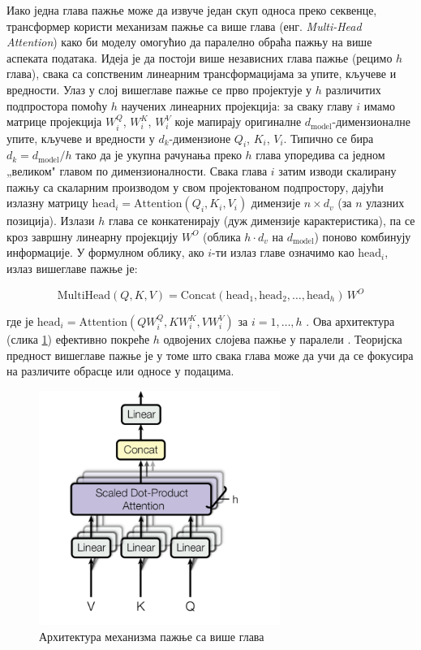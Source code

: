 \documentclass[a4paper, 12pt, master, utf8]{etf}
\begin{document}
Иако једна глава пажње може да извуче један скуп односа преко секвенце, трансформер користи механизам пажње са више глава (енг. \textit{Multi-Head Attention}) како би моделу омогућио да паралелно обраћа пажњу на више аспеката података. Идеја је да постоји више независних глава пажње (рецимо $h$ глава), свака са сопственим линеарним трансформацијама за упите, кључеве и вредности. Улаз у слој вишеглаве пажње се прво пројектује у $h$ различитих подпростора помоћу $h$ научених линеарних пројекција: за сваку главу $i$ имамо матрице пројекција $W_i^Q$, $W_i^K$, $W_i^V$ које мапирају оригиналне $d_{\text{model}}$-димензионалне упите, кључеве и вредности у $d_k$-димензионе $Q_i$, $K_i$, $V_i$. Типично се бира $d_k = d_{\text{model}}/h$ тако да је укупна рачунања преко $h$ глава упоредива са једном „великом" главом по димензионалности. Свака глава $i$ затим изводи скалирану пажњу са скаларним производом у свом пројектованом подпростору, дајући излазну матрицу $\text{head}_i = \text{Attention}(Q_i, K_i, V_i)$ димензије $n \times d_v$ (за $n$ улазних позиција). Излази $h$ глава се конкатенирају (дуж димензије карактеристика), па се кроз завршну линеарну пројекцију $W^O$ (облика $h\cdot d_v$ на $d_{\text{model}}$) поново комбинују информације. У формулном облику, ако $i$-ти излаз главе означимо као $\text{head}_i$, излаз вишеглаве пажње је:

\begin{equation}
\text{MultiHead}(Q, K, V) = \text{Concat}(\text{head}_1, \text{head}_2, \dots, \text{head}_h)\,W^O
\label{eq:multihead}
\end{equation}

где је $\text{head}_i = \text{Attention}(Q W_i^Q, K W_i^K, V W_i^V)$ за $i=1,\dots,h$ \cite{vaswani_attention_2017}. Ова архитектура (слика \ref{fig:multi_head_attention}) ефективно покреће $h$ одвојених слојева пажње у паралели \cite{vaswani_attention_2017}. Теоријска предност вишеглаве пажње је у томе што свака глава може да учи да се фокусира на различите обрасце или односе у подацима.

\begin{figure}[h]
    \centering
    \includegraphics[width=0.7\textwidth]{images/multi-head-attention.png}
    \caption{Архитектура механизма пажње са више глава}
    \label{fig:multi_head_attention}
\end{figure}
\end{document}
